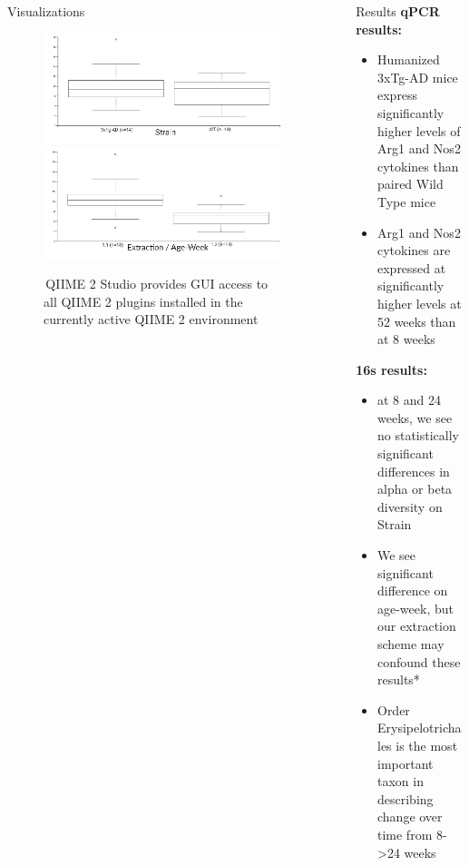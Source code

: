 \documentclass[final]{beamer}
\newlength{\sepwidth}
\newlength{\colwidth}
\newcommand{\separatorcolumn}{\begin{column}{\sepwidth}\end{column}}
\begin{document}
\begin{frame}[t]
\begin{columns}[t]
\begin{column}{\colwidth}
\begin{block}{Visualizations}
  \begin{figure}[tph!]
    {\includegraphics[width=.75\linewidth]{assets/faith_pd_group_sig_strain}}
    {\includegraphics[width=.75\linewidth]{assets/faith_pd_group_sig_extraction}}
      \caption{\,QIIME 2 Studio provides GUI access to all QIIME 2 plugins installed in the currently active QIIME 2 environment}
      \label{fig:faith_strain}
    \end{figure}
  \end{block}

\end{column}

\separatorcolumn

\begin{column}{\colwidth}
    \begin{block}{Results}
      \textbf{qPCR results:}
      \begin{itemize}
        \item Humanized 3xTg-AD mice express significantly higher levels of Arg1 and Nos2 cytokines than paired Wild Type mice
        \item Arg1 and Nos2 cytokines are expressed at significantly higher levels at 52 weeks than at 8 weeks
      \end{itemize}

      \textbf{16s results:}
      \begin{itemize}
      \item at 8 and 24 weeks, we see no statistically significant differences in alpha or beta diversity on Strain
      \item We see significant difference on age-week, but our extraction scheme may confound these results*
      \item Order Erysipelotrichales is the most important taxon in describing change over time from 8->24 weeks
      \end{itemize}


\end{block}
\end{column}
\end{columns}
\end{frame}
\end{document}
